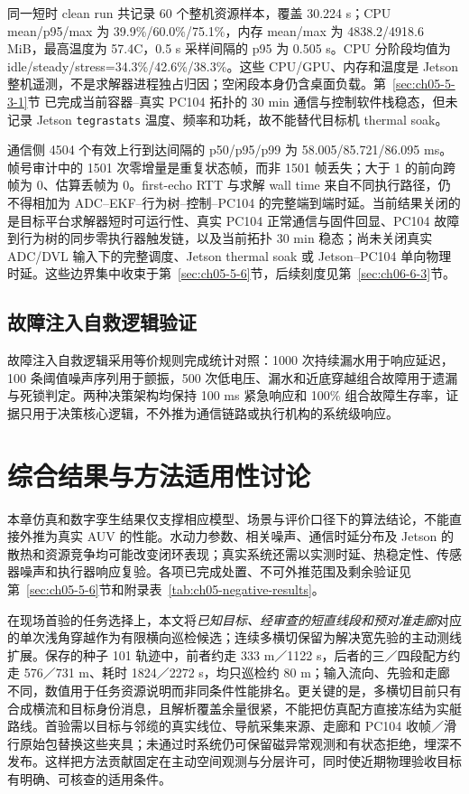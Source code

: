 同一短时 clean run 共记录 60 个整机资源样本，覆盖 30.224 s；CPU mean/p95/max 为 39.9\%/60.0\%/75.1\%，内存 mean/max 为 4838.2/4918.6 MiB，最高温度为 57.4\textdegree C，0.5 s 采样间隔的 p95 为 0.505 s。CPU 分阶段均值为 idle/steady/stress=34.3\%/42.6\%/38.3\%。这些 CPU/GPU、内存和温度是 Jetson 整机遥测，不是求解器进程独占归因；空闲段本身仍含桌面负载。第~\ref{sec:ch05-5-3-1}节 已完成当前容器--真实 PC104 拓扑的 30 min 通信与控制软件栈稳态，但未记录 Jetson \texttt{tegrastats} 温度、频率和功耗，故不能替代目标机 thermal soak。

通信侧 4504 个有效上行到达间隔的 p50/p95/p99 为 58.005/85.721/86.095 ms。帧号审计中的 1501 次零增量是重复状态帧，而非 1501 帧丢失；大于 1 的前向跨帧为 0、估算丢帧为 0。first-echo RTT 与求解 wall time 来自不同执行路径，仍不得相加为 ADC--EKF--行为树--控制--PC104 的完整端到端时延。当前结果关闭的是目标平台求解器短时可运行性、真实 PC104 正常通信与固件回显、PC104 故障到行为树的同步零执行器触发链，以及当前拓扑 30 min 稳态；尚未关闭真实 ADC/DVL 输入下的完整调度、Jetson thermal soak 或 Jetson--PC104 单向物理时延。这些边界集中收束于第~\ref{sec:ch05-5-6}节，后续刻度见第~\ref{sec:ch06-6-3}节。

\subsection{故障注入自救逻辑验证}\label{sec:ch05-5-3-4}

故障注入自救逻辑采用等价规则完成统计对照：1000 次持续漏水用于响应延迟，100 条阈值噪声序列用于颤振，500 次低电压、漏水和近底穿越组合故障用于遗漏与死锁判定。两种决策架构均保持 100 ms 紧急响应和 100\% 组合故障生存率，证据只用于决策核心逻辑，不外推为通信链路或执行机构的系统级响应。

\section{综合结果与方法适用性讨论}\label{sec:ch05-5-5-9}

本章仿真和数字孪生结果仅支撑相应模型、场景与评价口径下的算法结论，不能直接外推为真实 AUV 的性能。水动力参数、相关噪声、通信时延分布及 Jetson 的散热和资源竞争均可能改变闭环表现；真实系统还需以实测时延、热稳定性、传感器噪声和执行器响应复验。各项已完成处置、不可外推范围及剩余验证见第~\ref{sec:ch05-5-6}节和附录表~\ref{tab:ch05-negative-results}。

在现场首验的任务选择上，本文将\emph{已知目标、经审查的短直线段和预对准走廊}对应的单次浅角穿越作为有限横向巡检候选；连续多横切保留为解决宽先验的主动测线扩展。保存的种子 101 轨迹中，前者约走 333 m／1122 s，后者的三／四段配方约走 576／731 m、耗时 1824／2272 s，均只巡检约 80 m；输入流向、先验和走廊不同，数值用于任务资源说明而非同条件性能排名。更关键的是，多横切目前只有合成横流和目标身份消息，且解析覆盖余量很紧，不能把仿真配方直接冻结为实艇路线。首验需以目标与邻缆的真实线位、导航采集来源、走廊和 PC104 收帧／滑行原始包替换这些夹具；未通过时系统仍可保留磁异常观测和有状态拒绝，埋深不发布。这样把方法贡献固定在主动空间观测与分层许可，同时使近期物理验收目标有明确、可核查的适用条件。

